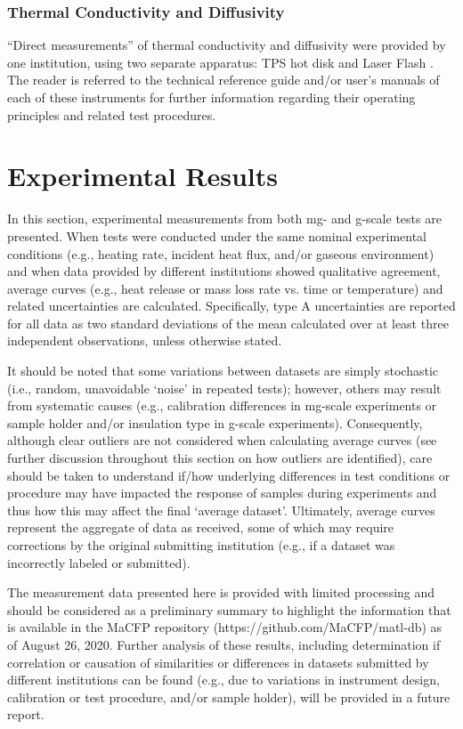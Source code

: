 \documentclass{book}
\begin{document}
\subsection{Thermal Conductivity and Diffusivity}

``Direct measurements'' of thermal conductivity and diffusivity were provided by one institution, using two separate apparatus: TPS hot disk \cite{gustafsson1991transient} and Laser Flash \cite{NeztschLFA}. The reader is referred to the technical reference guide and/or user’s manuals of each of these instruments for further information regarding their operating principles and related test procedures.



\chapter{Experimental Results}

In this section, experimental measurements from both mg- and g-scale tests are presented. When tests were conducted under the same nominal experimental conditions (e.g., heating rate, incident heat flux, and/or gaseous environment) and when data provided by different institutions showed qualitative agreement, average curves (e.g., heat release or mass loss rate vs. time or temperature) and related uncertainties are calculated. Specifically, type A uncertainties \cite{taylor1994nist} are reported for all data as two standard deviations of the mean calculated over at least three independent observations, unless otherwise stated.

It should be noted that some variations between datasets are simply stochastic (i.e., random, unavoidable ‘noise’ in repeated tests); however, others may result from systematic causes (e.g., calibration differences in mg-scale experiments or sample holder and/or insulation type in g-scale experiments). Consequently, although clear outliers are not considered when calculating average curves (see further discussion throughout this section on how outliers are identified), care should be taken to understand if/how underlying differences in test conditions or procedure may have impacted the response of samples during experiments and thus how this may affect the final ‘average dataset’. Ultimately, average curves represent the aggregate of data as received, some of which may require corrections by the original submitting institution (e.g., if a dataset was incorrectly labeled or submitted).

The measurement data presented here is provided with limited processing and should be considered as a preliminary summary to highlight the information that is available in the MaCFP repository (https://github.com/MaCFP/matl-db) as of August 26, 2020. Further analysis of these results, including determination if correlation or causation of similarities or differences in datasets submitted by different institutions can be found (e.g., due to variations in instrument design, calibration or test procedure, and/or sample holder), will be provided in a future report.
\end{document}
